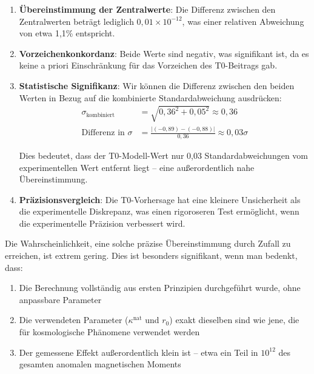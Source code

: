 \documentclass[12pt,a4paper]{article}
\begin{document}
	\begin{enumerate}
		\item \textbf{Übereinstimmung der Zentralwerte}: Die Differenz zwischen den Zentralwerten beträgt lediglich $0,01 \times 10^{-12}$, was einer relativen Abweichung von etwa 1,1\% entspricht.
		
		\item \textbf{Vorzeichenkonkordanz}: Beide Werte sind negativ, was signifikant ist, da es keine a priori Einschränkung für das Vorzeichen des T0-Beitrags gab.
		
		\item \textbf{Statistische Signifikanz}: Wir können die Differenz zwischen den beiden Werten in Bezug auf die kombinierte Standardabweichung ausdrücken:
		\begin{align}
			\sigma_{\text{kombiniert}} &= \sqrt{0,36^2 + 0,05^2} \approx 0,36 \\
			\text{Differenz in } \sigma &= \frac{|(-0,89) - (-0,88)|}{0,36} \approx 0,03\sigma
		\end{align}
		
		Dies bedeutet, dass der T0-Modell-Wert nur 0,03 Standardabweichungen vom experimentellen Wert entfernt liegt – eine außerordentlich nahe Übereinstimmung.
		
		\item \textbf{Präzisionsvergleich}: Die T0-Vorhersage hat eine kleinere Unsicherheit als die experimentelle Diskrepanz, was einen rigoroseren Test ermöglicht, wenn die experimentelle Präzision verbessert wird.
	\end{enumerate}
	
	Die Wahrscheinlichkeit, eine solche präzise Übereinstimmung durch Zufall zu erreichen, ist extrem gering. Dies ist besonders signifikant, wenn man bedenkt, dass:
	
	\begin{enumerate}
		\item Die Berechnung vollständig aus ersten Prinzipien durchgeführt wurde, ohne anpassbare Parameter
		
		\item Die verwendeten Parameter ($\kappa^{\text{nat}}$ und $r_0$) exakt dieselben sind wie jene, die für kosmologische Phänomene verwendet werden
		
		\item Der gemessene Effekt außerordentlich klein ist – etwa ein Teil in $10^{12}$ des gesamten anomalen magnetischen Moments
	\end{enumerate}
	
\end{document}
